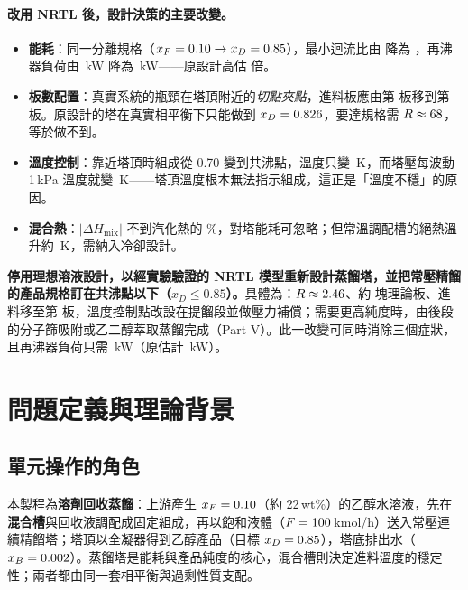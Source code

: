 \documentclass[UTF8,a4paper,11pt,fontset=none,zihao=-4]{ctexart}
\numberwithin{equation}{section}\renewcommand{\theequation}{\arabic{section}.\arabic{equation}}
\numberwithin{figure}{section}\renewcommand{\thefigure}{\arabic{section}.\arabic{figure}}
\numberwithin{table}{section}\renewcommand{\thetable}{\arabic{section}.\arabic{table}}
\begin{document}
\paragraph{改用 NRTL 後，設計決策的主要改變。}
\begin{itemize}
\item \textbf{能耗}：同一分離規格（$x_F=0.10\to x_D=0.85$），最小迴流比由 \nRminId{} 降為 \nRminNl，再沸器負荷由 \nQBId\,kW 降為 \nQBNl\,kW——原設計高估 \nQBratio{} 倍。
\item \textbf{板數配置}：真實系統的瓶頸在塔頂附近的\emph{切點夾點}，進料板應由第 \nNFId{} 板移到第 \nNFNl{} 板。原設計的塔在真實相平衡下只能做到 $x_D=0.826$，要達規格需 $R\approx68$，等於做不到。
\item \textbf{溫度控制}：靠近塔頂時組成從 0.70 變到共沸點，溫度只變 \nsdTtop\,K，而塔壓每波動 1\,kPa 溫度就變 \nsdTdP\,K——塔頂溫度根本無法指示組成，這正是「溫度不穩」的原因。
\item \textbf{混合熱}：$|\Delta H_{\mathrm{mix}}|$ 不到汽化熱的 \nhEratio\%，對塔能耗可忽略；但常溫調配槽的絕熱溫升約 \ndTadExp\,K，需納入冷卻設計。
\end{itemize}

\begin{keybox}[我們最重要的一項工程建議]
\textbf{停用理想溶液設計，以經實驗驗證的 NRTL 模型重新設計蒸餾塔，並把常壓精餾的產品規格訂在共沸點以下（$x_D\le0.85$）。}具體為：$R\approx2.46$、約 \nNNl{} 塊理論板、進料移至第 \nNFNl{} 板，溫度控制點改設在提餾段並做壓力補償；需要更高純度時，由後段的分子篩吸附或乙二醇萃取蒸餾完成（Part V）。此一改變可同時消除三個症狀，且再沸器負荷只需 \nQBNl\,kW（原估計 \nQBId\,kW）。
\end{keybox}

\section{問題定義與理論背景}\label{sec:theory}

\subsection{單元操作的角色}
本製程為\textbf{溶劑回收蒸餾}：上游產生 $x_F=0.10$（約 22\,wt\%）的乙醇水溶液，先在\textbf{混合槽}與回收液調配成固定組成，再以飽和液體（$F=100$\,kmol/h）送入常壓連續精餾塔；塔頂以全凝器得到乙醇產品（目標 $x_D=0.85$），塔底排出水（$x_B=0.002$）。蒸餾塔是能耗與產品純度的核心，混合槽則決定進料溫度的穩定性；兩者都由同一套相平衡與過剩性質支配。
\end{document}

